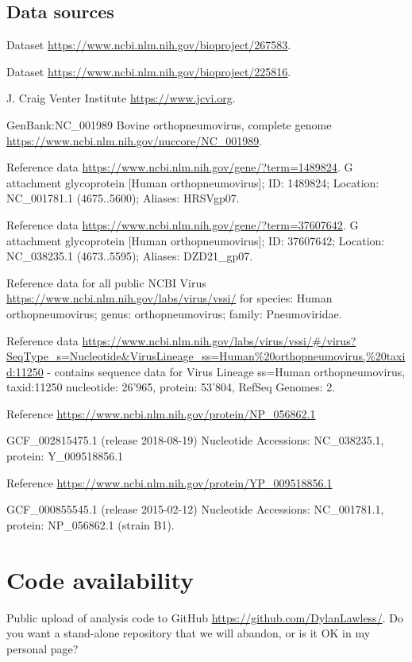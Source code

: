\documentclass{article}
\begin{document}
\subsection{Data sources}
\begin{description}[noitemsep]
\item Dataset \url{https://www.ncbi.nlm.nih.gov/bioproject/267583}.
\item Dataset \url{https://www.ncbi.nlm.nih.gov/bioproject/225816}.
\item J. Craig Venter Institute \url{https://www.jcvi.org}.
\item GenBank:NC\_001989 Bovine orthopneumovirus, complete genome \url{https://www.ncbi.nlm.nih.gov/nuccore/NC_001989}.
\item Reference data \url{https://www.ncbi.nlm.nih.gov/gene/?term=1489824}.
G attachment glycoprotein [Human orthopneumovirus]; ID: 1489824; Location: NC\_001781.1 (4675..5600); Aliases: HRSVgp07.
\item Reference data \url{https://www.ncbi.nlm.nih.gov/gene/?term=37607642}. 
G attachment glycoprotein [Human orthopneumovirus]; ID: 37607642; Location: NC\_038235.1 (4673..5595); Aliases: DZD21\_gp07.
\item Reference data for all public NCBI Virus 
\url{https://www.ncbi.nlm.nih.gov/labs/virus/vssi/} for species: Human orthopneumovirus; genus: orthopneumovirus; family: Pneumoviridae.
\item Reference data \url{https://www.ncbi.nlm.nih.gov/labs/virus/vssi/#/virus?SeqType_s=Nucleotide&VirusLineage_ss=Human\%20orthopneumovirus,\%20taxid:11250}
- contains sequence data for 
Virus Lineage ss=Human orthopneumovirus, taxid:11250
nucleotide: 26’965, 
protein: 53’804, 
RefSeq Genomes: 2.
\item Reference \url{https://www.ncbi.nlm.nih.gov/protein/NP_056862.1}
\item GCF\_002815475.1	(release 2018-08-19) Nucleotide Accessions: NC\_038235.1, protein: Y\_009518856.1
\item Reference \url{https://www.ncbi.nlm.nih.gov/protein/YP_009518856.1}
\item GCF\_000855545.1	(release 2015-02-12) Nucleotide Accessions: NC\_001781.1, protein: NP\_056862.1 (strain B1).
\end{description}

\section{Code availability}
Public upload of analysis code to GitHub \url{https://github.com/DylanLawless/}.
Do you want a stand-alone repository that we will abandon, or is it OK in my personal page?
\end{document}
